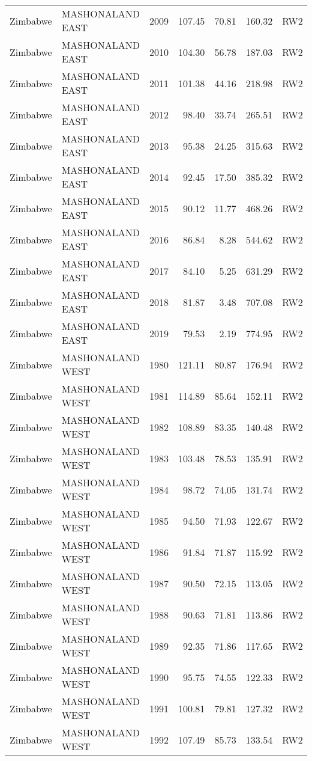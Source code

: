 \begin{longtable}{lllrrrl}
  Zimbabwe & MASHONALAND EAST & 2009 & 107.45 & 70.81 & 160.32 & RW2 \\ 
  Zimbabwe & MASHONALAND EAST & 2010 & 104.30 & 56.78 & 187.03 & RW2 \\ 
  Zimbabwe & MASHONALAND EAST & 2011 & 101.38 & 44.16 & 218.98 & RW2 \\ 
  Zimbabwe & MASHONALAND EAST & 2012 & 98.40 & 33.74 & 265.51 & RW2 \\ 
  Zimbabwe & MASHONALAND EAST & 2013 & 95.38 & 24.25 & 315.63 & RW2 \\ 
  Zimbabwe & MASHONALAND EAST & 2014 & 92.45 & 17.50 & 385.32 & RW2 \\ 
  Zimbabwe & MASHONALAND EAST & 2015 & 90.12 & 11.77 & 468.26 & RW2 \\ 
  Zimbabwe & MASHONALAND EAST & 2016 & 86.84 & 8.28 & 544.62 & RW2 \\ 
  Zimbabwe & MASHONALAND EAST & 2017 & 84.10 & 5.25 & 631.29 & RW2 \\ 
  Zimbabwe & MASHONALAND EAST & 2018 & 81.87 & 3.48 & 707.08 & RW2 \\ 
  Zimbabwe & MASHONALAND EAST & 2019 & 79.53 & 2.19 & 774.95 & RW2 \\ 
  Zimbabwe & MASHONALAND WEST & 1980 & 121.11 & 80.87 & 176.94 & RW2 \\ 
  Zimbabwe & MASHONALAND WEST & 1981 & 114.89 & 85.64 & 152.11 & RW2 \\ 
  Zimbabwe & MASHONALAND WEST & 1982 & 108.89 & 83.35 & 140.48 & RW2 \\ 
  Zimbabwe & MASHONALAND WEST & 1983 & 103.48 & 78.53 & 135.91 & RW2 \\ 
  Zimbabwe & MASHONALAND WEST & 1984 & 98.72 & 74.05 & 131.74 & RW2 \\ 
  Zimbabwe & MASHONALAND WEST & 1985 & 94.50 & 71.93 & 122.67 & RW2 \\ 
  Zimbabwe & MASHONALAND WEST & 1986 & 91.84 & 71.87 & 115.92 & RW2 \\ 
  Zimbabwe & MASHONALAND WEST & 1987 & 90.50 & 72.15 & 113.05 & RW2 \\ 
  Zimbabwe & MASHONALAND WEST & 1988 & 90.63 & 71.81 & 113.86 & RW2 \\ 
  Zimbabwe & MASHONALAND WEST & 1989 & 92.35 & 71.86 & 117.65 & RW2 \\ 
  Zimbabwe & MASHONALAND WEST & 1990 & 95.75 & 74.55 & 122.33 & RW2 \\ 
  Zimbabwe & MASHONALAND WEST & 1991 & 100.81 & 79.81 & 127.32 & RW2 \\ 
  Zimbabwe & MASHONALAND WEST & 1992 & 107.49 & 85.73 & 133.54 & RW2 \\ 

\end{longtable}
